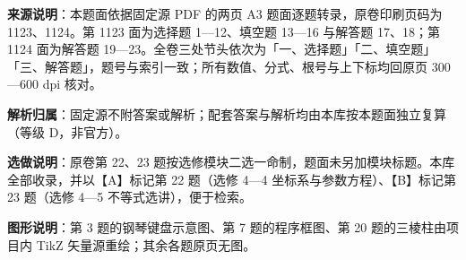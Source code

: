 

\begin{gknotice}
\textbf{来源说明}：本题面依据固定源 PDF 的两页 A3 题面逐题转录，原卷印刷页码为 1123、1124。第 1123 面为选择题 1—12、填空题 13—16 与解答题 17、18；第 1124 面为解答题 19—23。全卷三处节头依次为「一、选择题」「二、填空题」「三、解答题」，题号与索引一致；所有数值、分式、根号与上下标均回原页 300—600 dpi 核对。

\textbf{解析归属}：固定源不附答案或解析；配套答案与解析均由本库按本题面独立复算（等级 D，非官方）。

\textbf{选做说明}：原卷第 22、23 题按选修模块二选一命制，题面未另加模块标题。本库全部收录，并以【A】标记第 22 题（选修 4—4 坐标系与参数方程）、【B】标记第 23 题（选修 4—5 不等式选讲），便于检索。

\textbf{图形说明}：第 3 题的钢琴键盘示意图、第 7 题的程序框图、第 20 题的三棱柱由项目内 TikZ 矢量源重绘；其余各题原页无图。
\end{gknotice}


